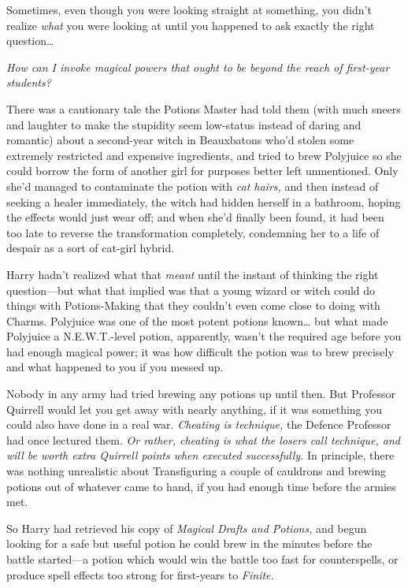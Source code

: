 Sometimes, even though you were looking straight at something, you didn't
realize \emph{what} you were looking at until you happened to ask exactly the
right question{\ldots}

\emph{How can I invoke magical powers that ought to be beyond the reach of
first-year students?}

There was a cautionary tale the Potions Master had told them (with much sneers
and laughter to make the stupidity seem low-status instead of daring and
romantic) about a second-year witch in Beauxbatons who'd stolen some extremely
restricted and expensive ingredients, and tried to brew Polyjuice so she could
borrow the form of another girl for purposes better left unmentioned. Only
she'd managed to contaminate the potion with \emph{cat hairs,} and then instead
of seeking a healer immediately, the witch had hidden herself in a bathroom,
hoping the effects would just wear off; and when she'd finally been found, it
had been too late to reverse the transformation completely, condemning her to a
life of despair as a sort of cat-girl hybrid.

Harry hadn't realized what that \emph{meant} until the instant of thinking the
right question---but what that implied was that a young wizard or witch could
do things with Potions-Making that they couldn't even come close to doing with
Charms. Polyjuice was one of the most potent potions known{\ldots} but what
made Polyjuice a N.E.W.T.-level potion, apparently, wasn't the required age
before you had enough magical power; it was how difficult the potion was to
brew precisely and what happened to you if you messed up.

Nobody in any army had tried brewing any potions up until then. But Professor
Quirrell would let you get away with nearly anything, if it was something you
could also have done in a real war. \emph{Cheating is technique,} the Defence
Professor had once lectured them. \emph{Or rather, cheating is what the losers
call technique, and will be worth extra Quirrell points when executed
successfully.} In principle, there was nothing unrealistic about Transfiguring
a couple of cauldrons and brewing potions out of whatever came to hand, if you
had enough time before the armies met.

So Harry had retrieved his copy of \emph{Magical Drafts and Potions,} and begun
looking for a safe but useful potion he could brew in the minutes before the
battle started---a potion which would win the battle too fast for
counterspells, or produce spell effects too strong for first-years to
\emph{Finite.}

